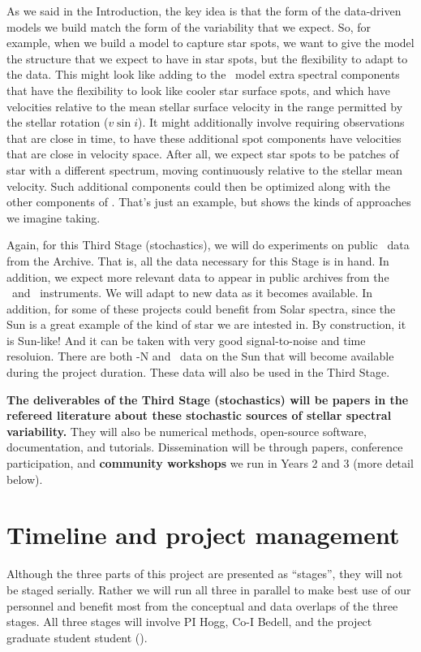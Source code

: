 \documentclass[12pt, letterpaper]{article}
\begin{document}
As we said in the Introduction, the key idea is that the form of the
data-driven models we build match the form of the variability that
we expect.
So, for example, when we build a model to capture star spots, we want
to give the model the structure that we expect to have in star spots,
but the flexibility to adapt to the data.
This might look like adding to the \wobble\ model extra spectral
components that have the flexibility to look like cooler star surface
spots, and which have velocities relative to the mean stellar surface
velocity in the range permitted by the stellar rotation ($v\sin i$).
It might additionally involve requiring observations that are close
in time, to have these additional spot components have velocities that
are close in velocity space.
After all, we expect star spots to be patches of star with a different
spectrum, moving continuously relative to the stellar mean velocity.
Such additional components could then be optimized along with the other
components of \wobble.
That's just an example, but shows the kinds of approaches we imagine taking.

Again, for this Third Stage (stochastics), we will do experiments on
public \HARPS\ data from the Archive.
That is, all the data necessary for this Stage is in hand.
In addition, we expect more relevant data to appear in public archives
from the \ESPRESSO\ and \NEID\ instruments.
We will adapt to new data as it becomes available.
In addition, for some of these projects could benefit from Solar
spectra, since the Sun is a great example of the kind of star we are
intested in.
By construction, it is Sun-like!
And it can be taken with very good signal-to-noise and time resoluion.
There are both \HARPS-N and \HARPS\ data on the Sun that will become
available during the project duration.
These data will also be used in the Third Stage.

\textbf{The deliverables of the Third Stage (stochastics) will be papers in the
refereed literature about these stochastic sources of stellar spectral
variability.}
They will also be numerical methods, open-source software, documentation,
and tutorials.
Dissemination will be through papers, conference participation, and
\textbf{community workshops} we run in Years 2 and 3 (more detail below).

\section{Timeline and project management}

Although the three parts of this project are presented as ``stages'',
they will not be staged serially.
Rather we will run all three in parallel to make best use of our
personnel and benefit most from the conceptual and data overlaps of the three stages.
All three stages will involve PI Hogg, Co-I Bedell, and the project
graduate student student (\GRA). 
\end{document}
